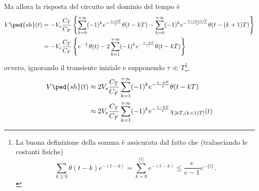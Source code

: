 \documentclass[10pt, a4paper, italian]{article}
\begin{document}
Ma allora la risposta del circuito nel dominio del tempo è
\begin{align*}
  V\ped{sh}(t) &= - V_s \frac{C_T}{C_F} \left\{ 
\sum_{k=0}^{+\infty} (-1)^{k}e^{-\frac{t - kT}{\tau}}\theta(t - kT) - 
\sum_{k=0}^{+\infty} (-1)^{k} e^{-\frac{t- (k+1) T }{\tau}} \theta(t - (k+1)T ) 
\right\} \\
               &= - V_s \frac{C_T}{C_F} \left\{ e^{-\frac{t}{\tau}} 
\theta(t) - 2 \sum_{k=1}^{+\infty} (-1)^{k} e^{-\frac{t - kT}{\tau}} \theta(t - 
kT) \right\}
\end{align*}
ovvero, ignorando il transiente iniziale e supponendo $ \tau\ll T $\footnote{
La buona definizione della somma è assicurata dal fatto che (tralasciando le 
costanti fisiche)
\[ \sum_{k \geq 0} \theta(t-k) e^{-(t-k)} = \sum_{k=0}^{\lfloor t \rfloor} 
e^{-(t-k)} \leq \frac{e}{e-1} e^{-\{t\}}. \]
},
\begin{align}\label{eq:Vshaper}
V\ped{sh}(t) &\approx 2 V_s \frac{C_T}{C_F} \sum_{k=1}^{+\infty} 
(-1)^{k} e^{-\frac{t - kT}{\tau}} \theta(t - kT) \nonumber\\
               &\approx  2 V_s \frac{C_T}{C_F} \sum_{k=1}^{+\infty} 
(-1)^{k} e^{-\frac{t - kT}{\tau}} \chi_{[kT, (k+1)T]}(t)
\end{align}
\end{document}
